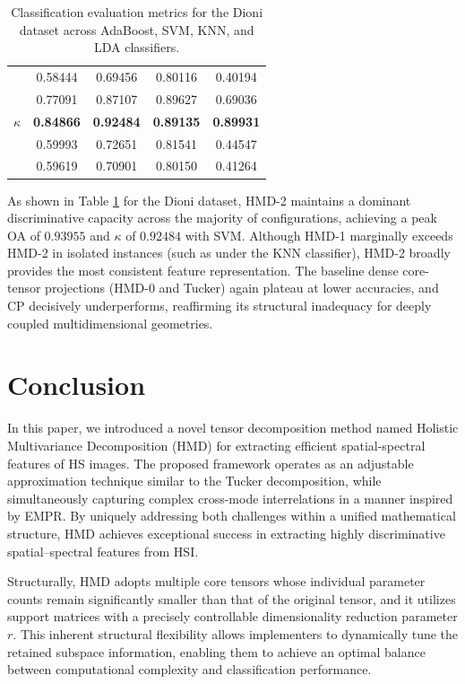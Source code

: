 \documentclass[12pt,onecolumn]{article}
\begin{document}
\begin{table}[h!]
\begin{tabular}{ccccc}
	 \hline     
	 \multirow{5}{*}{$\kappa$}	 
     & 0.58444 & 0.69456 & 0.80116 & 0.40194 \\
     & 0.77091 & 0.87107 & 0.89627 & 0.69036 \\
     & \textbf{0.84866} & \textbf{0.92484} & \textbf{0.89135} & \textbf{0.89931} \\
     & 0.59993 & 0.72651 & 0.81541 & 0.44547 \\
     & 0.59619 & 0.70901 & 0.80150 & 0.41264 \\
     \hline
\end{tabular}
\caption{Classification evaluation metrics for the Dioni dataset across AdaBoost, SVM, KNN, and LDA classifiers.}
\label{tab:dioni}
\end{table}     

As shown in Table \ref{tab:dioni} for the Dioni dataset, HMD-2 maintains a dominant discriminative capacity across the majority of configurations, achieving a peak OA of $0.93955$ and $\kappa$ of $0.92484$ with SVM. Although HMD-1 marginally exceeds HMD-2 in isolated instances (such as under the KNN classifier), HMD-2 broadly provides the most consistent feature representation. The baseline dense core-tensor projections (HMD-0 and Tucker) again plateau at lower accuracies, and CP decisively underperforms, reaffirming its structural inadequacy for deeply coupled multidimensional geometries.

\section{Conclusion}
\label{sec:conc}

In this paper, we introduced a novel tensor decomposition method named Holistic Multivariance Decomposition (HMD) for extracting efficient spatial-spectral features of HS images. The proposed framework operates as an adjustable approximation technique similar to the Tucker decomposition, while simultaneously capturing complex cross-mode interrelations in a manner inspired by EMPR. By uniquely addressing both challenges within a unified mathematical structure, HMD achieves exceptional success in extracting highly discriminative spatial–spectral features from HSI.

Structurally, HMD adopts multiple core tensors whose individual parameter counts remain significantly smaller than that of the original tensor, and it utilizes support matrices with a precisely controllable dimensionality reduction parameter $r$. This inherent structural flexibility allows implementers to dynamically tune the retained subspace information, enabling them to achieve an optimal balance between computational complexity and classification performance.
\end{document}

